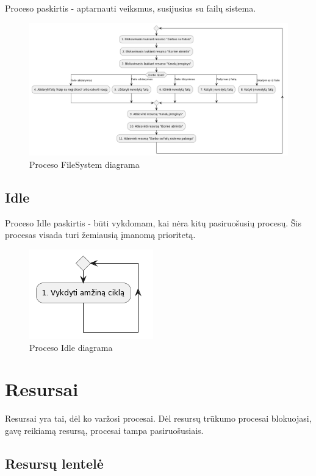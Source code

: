 \documentclass{VUMIFInfKursinis}
\begin{document}
Proceso paskirtis - aptarnauti veiksmus, susijusius su failų sistema.

\begin{figure}[H]
	\centering	
	\includegraphics[scale=0.35]{img/FileSystem}
	\caption{Proceso FileSystem diagrama}   %
	\label{img:FileSystem}
\end{figure}

\subsection{Idle}

Proceso Idle paskirtis - būti vykdomam, kai nėra kitų pasiruošusių procesų. Šis procesas visada turi žemiausią įmanomą prioritetą.

\begin{figure}[H]
	\centering	
	\includegraphics[scale=0.65]{img/Idle}
	\caption{Proceso Idle diagrama}   %
	\label{img:Idle}
\end{figure}


\section{Resursai}

Resursai yra tai, dėl ko varžosi procesai. Dėl resursų trūkumo procesai blokuojasi, gavę reikiamą resursą, procesai tampa pasiruošusiais.

\subsection{Resursų lentelė}
\end{document}
